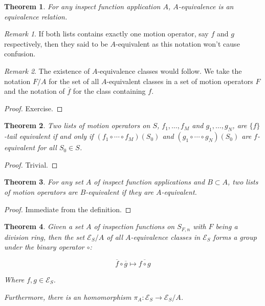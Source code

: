 \documentclass{book}
\newtheorem{theorem}{Theorem}
\theoremstyle{definition}\newtheorem{mechanism}{Mechanism}
\theoremstyle{remark}\newtheorem*{remark}{Remark}
\begin{document}
\begin{theorem}
	For any inspect function application $A$, $A$-equivalence is an equivalence relation.
\end{theorem}

\begin{remark}
	If both lists contains exactly one motion operator, say $f$ and $g$ respectively, then they said to be $A$-equivalent as this notation won't cause confusion.
\end{remark}

\begin{remark}
	The existence of $A$-equivalence classes would follow. We take the notation $F / A$ for the set of all $A$-equivalent classes in a set of motion operators $F$ and the notation of $\overline{f}$ for the class containing $f$.
\end{remark}

\begin{proof}
	Exercise.
\end{proof}

\begin{theorem}\label{thm:f-equiv-iff-tail-equiv}
	Two lists of motion operators on $S$, $f_1, \dots, f_M$ and $g_1, \dots, g_N$, are $\{f\}$-tail equivalent if and only if $(f_1 \circ \cdots \circ f_M)(S_0)$ and $(g_1 \circ \cdots \circ g_N)(S_0)$ are $f$-equivalent for all $S_0\in S$.
\end{theorem}

\begin{proof}
	Trivial.
\end{proof}

\begin{theorem}
	For any set $A$ of inspect function applications and $B\subset A$, two lists of motion operators are $B$-equivalent if they are $A$-equivalent.
\end{theorem}

\begin{proof}
	Immediate from the definition.
\end{proof}

\begin{theorem}
	Given a set $A$ of inspection functions on $S_{F, n}$ with $F$ being a division ring, then the set $\mathcal{E}_S / A$ of all $A$-equivalence classes in $\mathcal{E}_S$ forms a group under the binary operator $\circ$: 
	
	\begin{equation*}
		\overline{f} \circ \overline{g} \mapsto \overline{f \circ g}
	\end{equation*}
	
	Where $f, g \in \mathcal{E}_S$. 
	
	Furthermore, there is an homomorphism $\pi_A: \mathcal{E}_S \to \mathcal{E}_S / A$.
\end{theorem}
\end{document}
